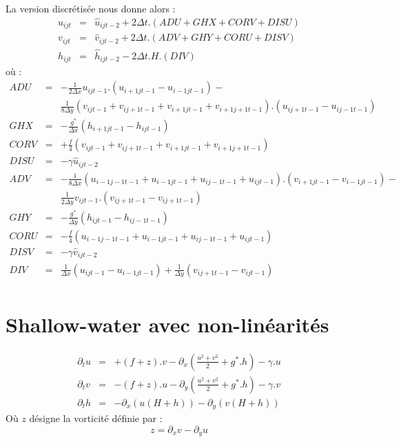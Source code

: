 \documentclass[a4paper,12pt]{article}
\begin{document}
La version discrétisée nous donne alors :
\begin{eqnarray*}
u_{ijt} & = & \hat{u}_{ijt-2}+2\Delta t. (ADU + GHX + CORV + DISU) \\
v_{ijt} & = & \hat{v}_{ijt-2}+2\Delta t. (ADV + GHY + CORU + DISV) \\
h_{ijt} & = & \hat{h}_{ijt-2}-2\Delta t . H . ( DIV ) 
\end{eqnarray*}
où :
\begin{eqnarray*}
ADU & = &  - \frac{1}{2\Delta x}u_{ijt-1}.(u_{i+1jt-1}-u_{i-1jt-1}) -  \\
    &   &   \frac{1}{8\Delta y}(v_{ijt-1}+v_{ij+1t-1}+v_{i+1jt-1}+v_{i+1j+1t-1}).(u_{ij+1t-1}-u_{ij-1t-1})\\
GHX & = &  -\frac{g^*}{\Delta x} (h_{i+1jt-1} - h_{ijt-1}) \\
CORV & = &  +\frac{f  }{4}        (v_{ijt-1}+v_{ij+1t-1}+v_{i+1jt-1}+v_{i+1j+1t-1}) \\
DISU & = &  -\gamma                \hat{u}_{ijt-2} \\
ADV & = & - \frac{1}{8\Delta x}(u_{i-1j-1t-1}+u_{i-1jt-1}+u_{ij-1t-1}+u_{ijt-1}).(v_{i+1jt-1}-v_{i-1jt-1}) - \\
    &   & \frac{1}{2\Delta y}v_{ijt-1}.(v_{ij+1t-1}-v_{ij+1t-1})  \\
GHY & = & -\frac{g^*}{\Delta y} (h_{ijt-1} - h_{ij-1t-1})\\
CORU & = & -\frac{f  }{4}        (u_{i-1j-1t-1}+u_{i-1jt-1}+u_{ij-1t-1}+u_{ijt-1}) \\
DISV & = &  -\gamma                \hat{v}_{ijt-2}\\
DIV & = & \frac{1}{\Delta x} (u_{ijt-1} - u_{i-1jt-1}) 
  + \frac{1}{\Delta y} (v_{ij+1t-1} - v_{ijt-1})\\
\end{eqnarray*}
\fi
\section{Shallow-water avec non-linéarités}

\begin{eqnarray}
\partial_tu & = & + (f + z ).v  - \partial_x (\frac{u^2+v^2}{2} + g^*.h) - \gamma . u \nonumber \\
\partial_tv & = & - (f + z ).u  - \partial_y (\frac{u^2+v^2}{2} + g^*.h) - \gamma . v \label{shal-nonlin-cs}\\
\partial_th & = & - \partial_x(u(H+h)) - \partial_y(v(H+h)) \nonumber
\end{eqnarray}
Où $z$ désigne la vorticité définie par :
\begin{equation}
z = \partial_xv - \partial_yu
\end{equation}
\end{document}
